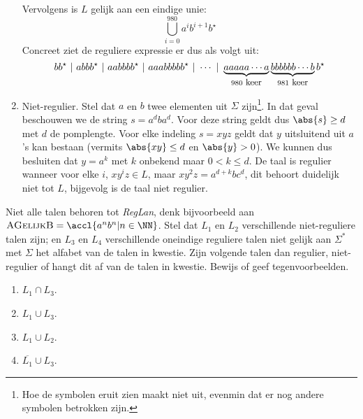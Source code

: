 \documentclass{article}
\newcommand{\lang}[1]{\textsc{#1}}
\begin{document}
\begin{answer}
\begin{enumerate}
\begin{equation}
 \end{equation}
 Vervolgens is $L$ gelijk aan een eindige unie:
 \begin{equation}
  \displaystyle\bigcup_{i=0}^{980} a^ib^{i+1}b^\star
 \end{equation}
Concreet ziet de reguliere expressie er dus als volgt uit:
\begin{equation}
 bb^\star\ |\ abbb^\star\ |\ aabbbb^\star\ |\ aaabbbbb^\star\ |\ \cdots\ |\ \underbrace{aaaaa\cdots a}_{980\mbox{\small{ keer}}}\underbrace{bbbbbb\cdots b}_{981\mbox{\small{ keer}}}b^\star
\end{equation}
 \item Niet-regulier. Stel dat $a$ en $b$ twee elementen uit $\Sigma$ zijn\footnote{Hoe de symbolen eruit zien maakt niet uit, evenmin dat er nog andere symbolen betrokken zijn.}. In dat geval beschouwen we de string $s=a^dba^d$. Voor deze string geldt dus $\abs{s}\geq d$ met $d$ de pomplengte. Voor elke indeling $s=xyz$ geldt dat $y$ uitsluitend uit $a$'s kan bestaan (vermits $\abs{xy}\leq d$ en $\abs{y}>0$). We kunnen dus besluiten dat $y=a^k$ met $k$ onbekend maar $0<k\leq d$. De taal is regulier wanneer voor elke $i$, $xy^iz\in L$, maar $xy^2z=a^{d+k}bc^d$, dit behoort duidelijk niet tot $L$, bijgevolg is de taal niet regulier.
\end{enumerate}
\end{answer}
\begin{question}
Niet alle talen behoren tot \emph{RegLan}, denk bijvoorbeeld aan $\lang{AGelijkB}=\accl{a^nb^n|n\in\NN}$. Stel dat $L_1$
en $L_2$ verschillende niet-reguliere talen zijn; en $L_3$ en $L_4$ verschillende oneindige reguliere talen niet gelijk
aan $\Sigma^*$ met $\Sigma$ het alfabet van de talen in kwestie. Zijn volgende talen dan regulier, niet-regulier of
hangt dit af van de talen in kwestie. Bewijs of geef tegenvoorbeelden.
\begin{enumerate}
 \item $L_1\cap L_3$.
 \item $L_1\cup L_3$.
 \item $L_1\cup L_2$.
 \item $\overline{L_1}\cup L_3$.
\end{enumerate}
\end{question}
\end{document}

